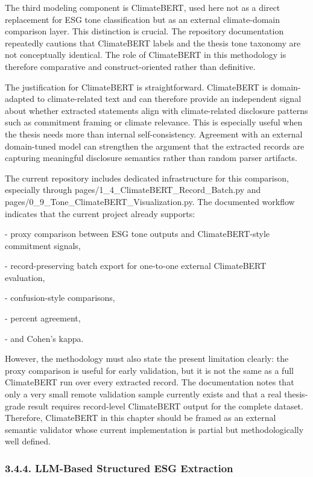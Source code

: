 \documentclass{article}
\begin{document}
The third modeling component is ClimateBERT, used here not as a direct replacement for ESG tone classification but as an external climate-domain comparison layer. This distinction is crucial. The repository documentation repeatedly cautions that ClimateBERT labels and the thesis tone taxonomy are not conceptually identical. The role of ClimateBERT in this methodology is therefore comparative and construct-oriented rather than definitive.

The justification for ClimateBERT is straightforward. ClimateBERT is domain-adapted to climate-related text and can therefore provide an independent signal about whether extracted statements align with climate-related disclosure patterns such as commitment framing or climate relevance. This is especially useful when the thesis needs more than internal self-consistency. Agreement with an external domain-tuned model can strengthen the argument that the extracted records are capturing meaningful disclosure semantics rather than random parser artifacts.

The current repository includes dedicated infrastructure for this comparison, especially through pages/1\_4\_ClimateBERT\_Record\_Batch.py and pages/0\_9\_Tone\_ClimateBERT\_Visualization.py. The documented workflow indicates that the current project already supports:

- proxy comparison between ESG tone outputs and ClimateBERT-style commitment signals,

- record-preserving batch export for one-to-one external ClimateBERT evaluation,

- confusion-style comparisons,

- percent agreement,

- and Cohen’s kappa.

However, the methodology must also state the present limitation clearly: the proxy comparison is useful for early validation, but it is not the same as a full ClimateBERT run over every extracted record. The documentation notes that only a very small remote validation sample currently exists and that a real thesis-grade result requires record-level ClimateBERT output for the complete dataset. Therefore, ClimateBERT in this chapter should be framed as an external semantic validator whose current implementation is partial but methodologically well defined.
\subsubsection*{ 3.4.4. LLM-Based Structured ESG Extraction}
\end{document}
